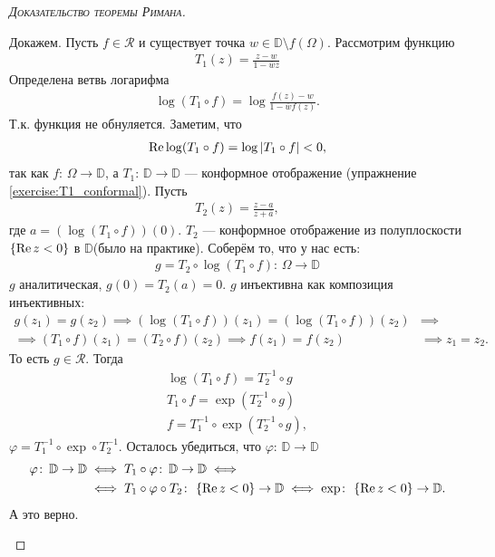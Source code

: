 \documentclass[../complex-analysis.tex]{subfiles}
\begin{document}
\begin{proof}[\normalfont\textsc{Доказательство теоремы Римана}]
\begin{enumerate}
   Докажем. Пусть $ f \in \mathcal R $ и существует точка $ w \in \mathbb D \setminus f(\Omega) $. Рассмотрим функцию
   \begin{align*}
    T_1(z) = \frac{z-w}{1 - \overline w z}
   \end{align*} Определена ветвь логарифма
   \begin{align*}
    \log (T_1 \circ f) = \log \frac{f(z) - w}{1 - \overline w f(z)}.
   \end{align*} Т.к. функция не обнуляется. Заметим, что
   \begin{align*}
    \operatorname{Re} \log (T_1 \circ f) = \log \left| T_1 \circ f \right| < 0,
\end{align*} так как $ f \colon\,\Omega \to \mathbb D $, а $ T_1 \colon\,\mathbb D \to \mathbb D $ --- конформное отображение (упражнение \eqref{exercise:T1_conformal}). Пусть
   \begin{align*}
    T_2(z) = \frac{z-a}{z+\overline a},
   \end{align*} где $ a = (\log (T_1 \circ f))(0) $. $ T_2 $ --- конформное отображение из полуплоскости $ \left\{ \operatorname{Re} z < 0 \right\} $ в $ \mathbb D $(было на практике). Соберём то, что у нас есть:
   \begin{align*}
    g = T_2 \circ \log (T_1 \circ f)\colon\,\Omega \to \mathbb D
   \end{align*} $ g $ аналитическая, $ g(0) = T_2(a) = 0 $. $ g $ инъективна как композиция инъективных:
   \begin{align*}
	   g(z_1) = g(z_2) \implies (\log(T_1 \circ f))(z_1) = (\log(T_1 \circ f))(z_2) &\implies \\
	   \implies (T_1 \circ f) (z_1) = (T_2 \circ f)(z_2) \implies f(z_1) = f(z_2) &\implies z_1 = z_2.
   \end{align*} То есть $ g \in \mathcal R $. Тогда
   \begin{align*}
    \log(T_1 \circ f) = T_2^{-1} \circ g \\
    T_1 \circ f = \exp (T_2^{-1} \circ g) \\
    f = T_1^{-1} \circ \exp (T_2^{-1} \circ g),
   \end{align*} $ \varphi = T_1^{-1} \circ \exp \circ T_2^{-1} $. Осталось убедиться, что $ \varphi \colon\,\mathbb D \to \mathbb D$ 
   \begin{align*}
	\varphi \colon\,\mathbb D \to \mathbb D &\iff T_1 \circ \varphi \colon\,\mathbb D \to \mathbb D \iff \\
	&\iff T_1 \circ \varphi \circ T_2 \colon\,\left\{ \operatorname{Re} z < 0 \right\} \to \mathbb D \iff \exp \colon\,\left\{ \operatorname{Re} z < 0 \right\} \to \mathbb D.
   \end{align*} А это верно.


\end{enumerate}
\end{proof}
\end{document}
